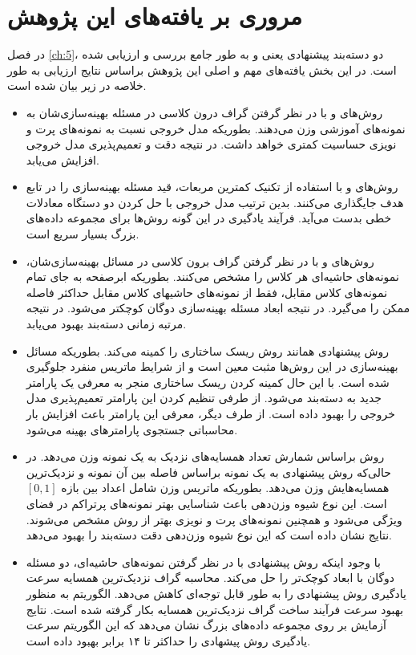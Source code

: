\section{مروری بر یافته‌های این پژوهش}\label{sec:6:3}
در فصل \ref{ch:5}، دو دسته‌بند پیشنهادی یعنی  و  به طور جامع بررسی و ارزیابی شده است. در این بخش یافته‌های مهم و اصلی این پژوهش براساس نتایج ارزیابی به طور خلاصه در زیر بیان شده است.
\begin{itemize}[label=$\bullet$]
	\item روش‌های   و   با در نظر گرفتن گراف درون کلاسی در مسئله بهینه‌سازی‌شان به نمونه‌های آموزشی وزن می‌دهند. بطوریکه مدل خروجی نسبت به نمونه‌های پرت و نویزی حساسیت کمتری خواهد داشت. در نتیجه دقت و تعمیم‌پذیری مدل خروجی افزایش می‌یابد.
	\item روش‌های   و   با استفاده از تکنیک کمترین مربعات، قید مسئله بهینه‌سازی را در تابع هدف جایگذاری می‌کنند. بدین ترتیب مدل خروجی با حل کردن دو دستگاه معادلات خطی بدست می‌آید. فرآیند یادگیری در این گونه روش‌ها برای مجموعه داده‌های بزرگ بسیار سریع است.
	\item روش‌های  و   با در نظر گرفتن گراف برون کلاسی در مسائل بهینه‌سازی‌شان، نمونه‌های حاشیه‌ای هر کلاس را مشخص می‌کنند. بطوریکه ابرصفحه به جای تمام نمونه‌های کلاس مقابل، فقط از نمونه‌های حاشیها‌‌‌ی کلاس مقابل حداکثر فاصله ممکن را می‌گیرد. در نتیجه ابعاد مسئله بهینه‌سازی دوگان کوچکتر می‌شود. در نتیجه مرتبه زمانی دسته‌بند بهبود می‌یابد.
	\item روش پیشنهادی   همانند روش   ریسک ساختاری را کمینه می‌کند. بطوریکه مسائل بهینه‌سازی در این  روش‌ها مثبت معین است و از شرایط ماتریس منفرد جلوگیری شده است. با این حال کمینه کردن ریسک ساختاری منجر به معرفی یک پارامتر جدید به دسته‌بند می‌شود. از طرفی تنظیم کردن این پارامتر تعمیم‌پذیری مدل خروجی را بهبود داده است. از طرف دیگر، معرفی این پارامتر باعث افزایش بار محاسباتی جستجوی پارامترهای بهینه می‌شود. 
	\item روش   براساس شمارش تعداد همسایه‌های نزدیک به یک نمونه وزن می‌دهد. در حالی‌که روش پیشنهادی   به یک نمونه براساس فاصله بین آن نمونه و نزدیک‌ترین همسایه‌هایش وزن می‌دهد. بطوریکه ماتریس وزن شامل اعداد بین بازه   $\left[0,1\right]$ است. این نوع شیوه وزن‌دهی باعث شناسایی بهتر نمونه‌های پرتراکم در فضای ویژگی می‌شود و همچنین نمونه‌های پرت و نویزی بهتر از روش  مشخص می‌شوند. نتایج نشان داده است که این نوع شیوه وزن‌دهی دقت دسته‌بند  را بهبود می‌دهد.
	\item با وجود اینکه روش پیشنهادی   با در نظر گرفتن نمونه‌های حاشیه‌ای، دو مسئله دوگان با ابعاد کوچک‌تر را حل می‌کند. محاسبه گراف نزدیک‌ترین همسایه سرعت یادگیری روش پیشنهادی را به طور قابل توجه‌ای کاهش می‌دهد. الگوریتم  به منظور بهبود سرعت فرآیند ساخت گراف نزدیک‌ترین همسایه بکار گرفته شده است. نتایج آزمایش بر روی مجموعه داده‌های بزرگ نشان می‌دهد که این الگوریتم سرعت یادگیری روش پیشهادی را حداکثر تا ۱۴ برابر بهبود داده است.
\end{itemize}


